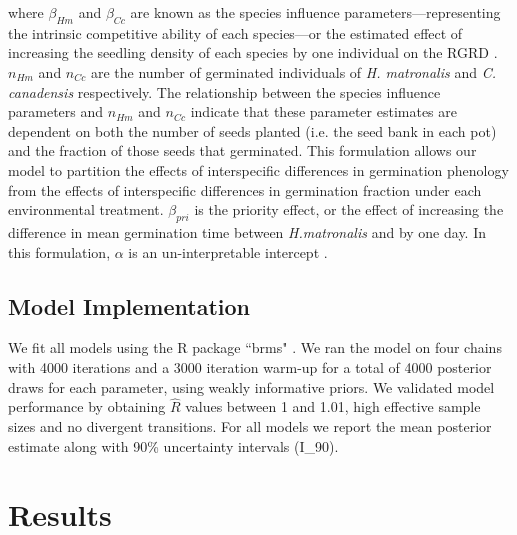 \documentclass{article}[11pt]
\begin{document}
where  $\beta_{Hm}$ and $\beta_{Cc}$ are known as the species influence parameters---representing the intrinsic competitive ability of each species---or the estimated effect of increasing the seedling density of each species by one individual on the RGRD \citep{Connolly2005}. $n_{Hm}$ and $n_{Cc}$ are the number of germinated individuals of \textit{H. matronalis} and \textit{C. canadensis} respectively. The relationship between the species influence parameters and $n_{Hm}$ and $n_{Cc}$ indicate that these parameter estimates are dependent on both the number of seeds planted (i.e. the seed bank in each pot) and the fraction of those seeds that germinated. This formulation allows our model to partition the effects of interspecific differences in germination phenology from the effects of interspecific differences in germination fraction under each environmental treatment. $\beta_{pri}$ is the priority effect, or the effect of increasing the difference in mean germination time between  \textit{H.matronalis} and  by one day.  In this formulation, $\alpha$ is an un-interpretable intercept \citep{Connolly2005}.


\subsection*{Model Implementation}
\noindent We fit all models using the R package ``brms" \citep{Burkner2018}.  We ran the model on four chains with 4000 iterations and a 3000 iteration warm-up for a total of 4000 posterior draws for each parameter, using weakly informative priors. We validated model performance by obtaining $\hat{R}$ values between 1 and 1.01, high effective sample sizes and no divergent transitions. For all models we report the mean posterior estimate along with 90\% uncertainty intervals (I_{90}).

\section*{Results}
\end{document}
